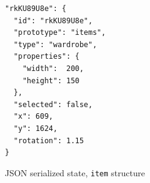 \begin{listing}
\begin{verbatim}
"rkKU89U8e": {
  "id": "rkKU89U8e",
  "prototype": "items",
  "type": "wardrobe",
  "properties": {
    "width":  200,
    "height": 150
  },
  "selected": false,
  "x": 609,
  "y": 1624,
  "rotation": 1.15
}
\end{verbatim}
\caption{JSON serialized state, {\tt item} structure} 
\label{lst:item}
\end{listing}

\fi


